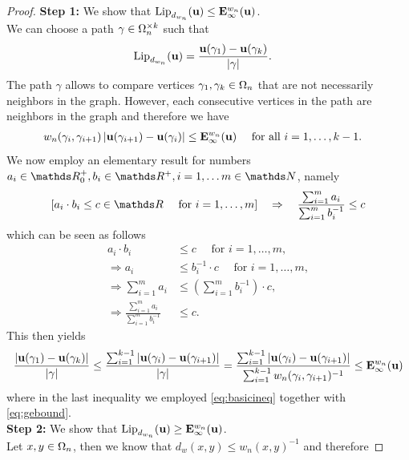 \begin{proof}
\textbf{Step 1:} We show that $\operatorname{Lip}_{d_{w_n}}(\mathbf{u}) \leq \mathbf{E}_\infty^{w_n}(\mathbf{u})$.\\
%
We can choose a path $\gamma\in\Omega_n^{\times k}$ such that
%
\begin{align*}
\operatorname{Lip}_{d_{w_n}}(\mathbf{u}) &= \frac{\mathbf{u}(\gamma_1) - \mathbf{u}(\gamma_k)}{\left|\gamma\right|}.
\end{align*}
%
The path $\gamma$ allows to compare vertices $\gamma_1, \gamma_k\in\Omega_n$ that are not necessarily neighbors in the graph. However, each consecutive vertices in the path are neighbors in the graph and therefore we have
%
\begin{align}\label{eq:gebound}
w_n(\gamma_i, \gamma_{i+1}) \left|\mathbf{u}(\gamma_{i+1}) - \mathbf{u}(\gamma_i)\right|
&\leq \mathbf{E}^{w_n}_\infty(\mathbf{u})\quad \text{ for all } i=1,\ldots, k-1.
\end{align} 
%
We now employ an elementary result for numbers $a_i\in\R^+_0, b_i\in\R^+, i=1,\ldots m\in\N$, namely
%
\begin{align}\label{eq:basicineq}
\left[
a_i\cdot b_i \leq c\in\R \quad\text{ for }
i=1,\ldots, m
\right]
%
\quad\Rightarrow\quad
%
\frac{\sum_{i=1}^{m}a_i}{\sum_{i=1}^{m} b_i^{-1}} \leq c
\end{align}
%
which can be seen as follows
%
\begin{align*}
a_i\cdot b_i &\leq c\quad\text{ for } i=1,\ldots, m,\\
\Rightarrow
a_i &\leq b_i^{-1}\cdot c \quad\text{ for } i=1,\ldots, m,\\
\Rightarrow\sum_{i=1}^{m} a_i &\leq \left(\sum_{i=1}^m b_i^{-1}\right)\cdot c,\\
%
\Rightarrow\frac{\sum_{i=1}^{m} a_i}{\sum_{i=1}^{m} b_i^{-1}} &\leq c.
\end{align*}
%
This then yields 
%
\begin{align*}
\frac{\abs{\vec u(\gamma_1) - \vec u(\gamma_k)}}{\abs{\gamma}}\leq
\frac{\sum_{i=1}^{k-1} \abs{\vec u(\gamma_i) - \vec u(\gamma_{i+1})}}{\abs{\gamma}} = 
\frac{\sum_{i=1}^{k-1} \abs{\vec u(\gamma_i) - \vec u(\gamma_{i+1})}}{\sum_{i=1}^{k-1} w_n(\gamma_i, \gamma_{i+1})^{-1}}
%
\leq
\GE^{w_n}_\infty(\vec u) 
\end{align*}
%
where in the last inequality we employed \cref{eq:basicineq} together with \cref{eq:gebound}.\\
%
\noindent%
\textbf{Step 2:} We show that $\operatorname{Lip}_{d_{w_n}}(\mathbf{u}) \geq\mathbf{E}_\infty^{w_n}(\mathbf{u})$.\\
%
Let $x,y\in \Omega_n$, then we know that $d_w(x,y) \leq w_n(x,y)^{-1}$ and therefore

\end{proof}
